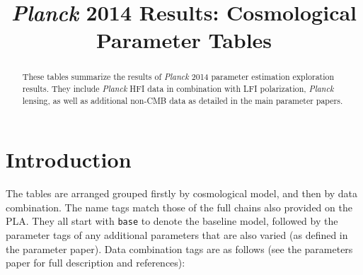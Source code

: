 \title{\textit{Planck} 2014 Results: Cosmological Parameter Tables}


\maketitle
\begin{abstract}
These tables summarize the results of \textit{Planck} 2014 parameter estimation exploration results. They include \textit{Planck} HFI data in combination with LFI polarization, \textit{Planck} lensing, as well as additional non-CMB data as detailed in the main parameter papers.
\end{abstract}

\newpage
\section{Introduction}

The tables are arranged grouped firstly by cosmological model, and then by data combination. The name tags match those of the full chains also provided on the PLA. They all start with {\tt base} to denote the baseline model, followed by the parameter tags of any additional parameters that are also varied (as defined in the parameter paper). Data combination tags are as follows (see the parameters paper for full description and references):

